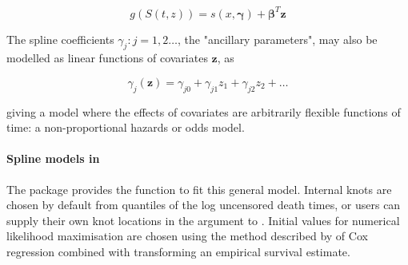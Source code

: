 \documentclass[nojss,nofooter]{jss}
\begin{document}
\[g(S(t,z)) = s(x, \bm{\gamma}) + \bm{\beta}^T \mathbf{z} \]


The spline coefficients $\gamma_j: j=1, 2 \ldots$, the "ancillary parameters",
may also be modelled as linear functions of covariates $\mathbf{z}$, as

\[\gamma_j(\mathbf{z}) = \gamma_{j0} + \gamma_{j1}z_1 + \gamma_{j2}z_2 + \ldots\]

giving a model where the effects of covariates are arbitrarily flexible
functions of time: a non-proportional hazards or odds model.

\paragraph{Spline models in }

The package provides the function  to fit this
general model. Internal knots are chosen by default from quantiles of
the log uncensored death times, or users can supply their own
knot locations in the  argument to .
Initial values for numerical likelihood maximisation are chosen using
the method described by \citet{royston:parmar} of Cox regression
combined with transforming an empirical survival estimate.
\end{document}
